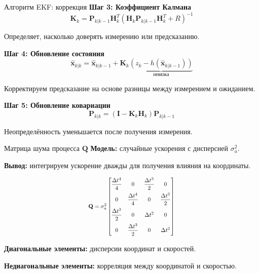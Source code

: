 \documentclass[aspectratio=169, 12pt]{beamer}
\begin{document}
\begin{frame}{Алгоритм EKF: коррекция}
    \textbf{Шаг 3: Коэффициент Калмана}
    \[
    \mathbf{K}_k = \mathbf{P}_{k|k-1} \mathbf{H}_k^T (\mathbf{H}_k \mathbf{P}_{k|k-1} \mathbf{H}_k^T + R)^{-1}
    \]
    
    Определяет, насколько доверять измерению или предсказанию.
    
    \vspace{0.1cm}
    \textbf{Шаг 4: Обновление состояния}
    \[
    \hat{\mathbf{x}}_{k|k} = \hat{\mathbf{x}}_{k|k-1} + \mathbf{K}_k \underbrace{(z_k - h(\hat{\mathbf{x}}_{k|k-1}))}_{\text{невязка}}
    \]
    
    Корректируем предсказание на основе разницы между измерением и ожиданием.
    
    \vspace{0.1cm}
    \textbf{Шаг 5: Обновление ковариации}
    \[
    \mathbf{P}_{k|k} = (\mathbf{I} - \mathbf{K}_k \mathbf{H}_k) \mathbf{P}_{k|k-1}
    \]
    
    Неопределённость уменьшается после получения измерения.
\end{frame}

\begin{frame}{Матрица шума процесса $\mathbf{Q}$}
    \textbf{Модель:} случайные ускорения с дисперсией $\sigma_a^2$.
    
    \textbf{Вывод:} интегрируем ускорение дважды для получения влияния на координаты.
    
    \begin{equation*}
        \scalebox{0.8}{$
        \mathbf{Q} = \sigma_a^2 \begin{bmatrix} 
            \dfrac{\Delta t^4}{4} & 0 & \dfrac{\Delta t^3}{2} & 0 \\[0.3cm]
            0 & \dfrac{\Delta t^4}{4} & 0 & \dfrac{\Delta t^3}{2} \\[0.3cm]
            \dfrac{\Delta t^3}{2} & 0 & \Delta t^2 & 0 \\[0.3cm]
            0 & \dfrac{\Delta t^3}{2} & 0 & \Delta t^2
        \end{bmatrix}
        $}
    \end{equation*}
    
    \textbf{Диагональные элементы:} дисперсии координат и скоростей.
    
    \textbf{Недиагональные элементы:} корреляция между координатой и скоростью.
\end{frame}
\end{document}
